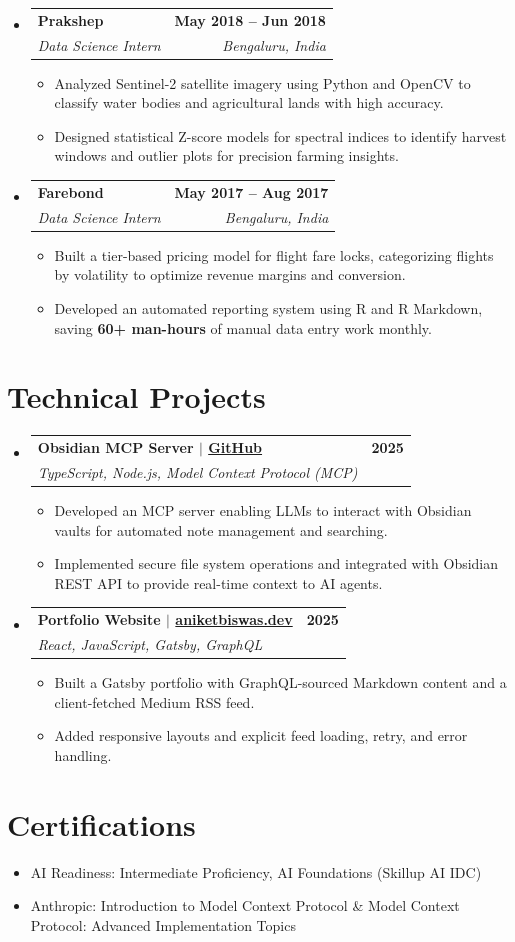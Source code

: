 \documentclass[a4paper,10pt]{article}
\makeatletter
\newcommand{\resumeSubheading}[4]{
  \vspace{-1pt}\item
  \begin{tabular*}{\textwidth}[t]{l@{\extracolsep{\fill}}r}
    \textbf{#1} & \textbf{#2} \\
    \textit{\small#3} & \textit{\small#4}
  \end{tabular*}\vspace{-6pt}
}
\newcommand{\resumeItem}[1]{\item \small{#1}}
\makeatother
\begin{document}
\begin{itemize}
  \resumeSubheading{Prakshep}{May 2018 -- Jun 2018}{Data Science Intern}{Bengaluru, India}
  \begin{itemize}
    \resumeItem{Analyzed Sentinel-2 satellite imagery using Python and OpenCV to classify water bodies and agricultural lands with high accuracy.}
    \resumeItem{Designed statistical Z-score models for spectral indices to identify harvest windows and outlier plots for precision farming insights.}
  \end{itemize}

  \resumeSubheading{Farebond}{May 2017 -- Aug 2017}{Data Science Intern}{Bengaluru, India}
  \begin{itemize}
    \resumeItem{Built a tier-based pricing model for flight fare locks, categorizing flights by volatility to optimize revenue margins and conversion.}
    \resumeItem{Developed an automated reporting system using R and R Markdown, saving \textbf{60+ man-hours} of manual data entry work monthly.}
  \end{itemize}
\end{itemize}

\section{Technical Projects}
\begin{itemize}
  \resumeSubheading{Obsidian MCP Server $|$ \normalfont\small\href{https://github.com/aniketbiswas/obsidian-mcp}{GitHub}}{2025}{TypeScript, Node.js, Model Context Protocol (MCP)}{}
  \begin{itemize}
    \resumeItem{Developed an MCP server enabling LLMs to interact with Obsidian vaults for automated note management and searching.}
    \resumeItem{Implemented secure file system operations and integrated with Obsidian REST API to provide real-time context to AI agents.}
  \end{itemize}

  \resumeSubheading{Portfolio Website $|$ \normalfont\small\href{https://aniketbiswas.dev}{aniketbiswas.dev}}{2025}{React, JavaScript, Gatsby, GraphQL}{}
  \begin{itemize}
    \resumeItem{Built a Gatsby portfolio with GraphQL-sourced Markdown content and a client-fetched Medium RSS feed.}
    \resumeItem{Added responsive layouts and explicit feed loading, retry, and error handling.}
  \end{itemize}
\end{itemize}

\section{Certifications}
\begin{itemize}[nosep, leftmargin=12pt, label=\textbullet]
  \item \small{AI Readiness: Intermediate Proficiency, AI Foundations (Skillup AI IDC)}
  \item \small{Anthropic: Introduction to Model Context Protocol \& Model Context Protocol: Advanced Implementation Topics}
\end{itemize}
\end{document}
